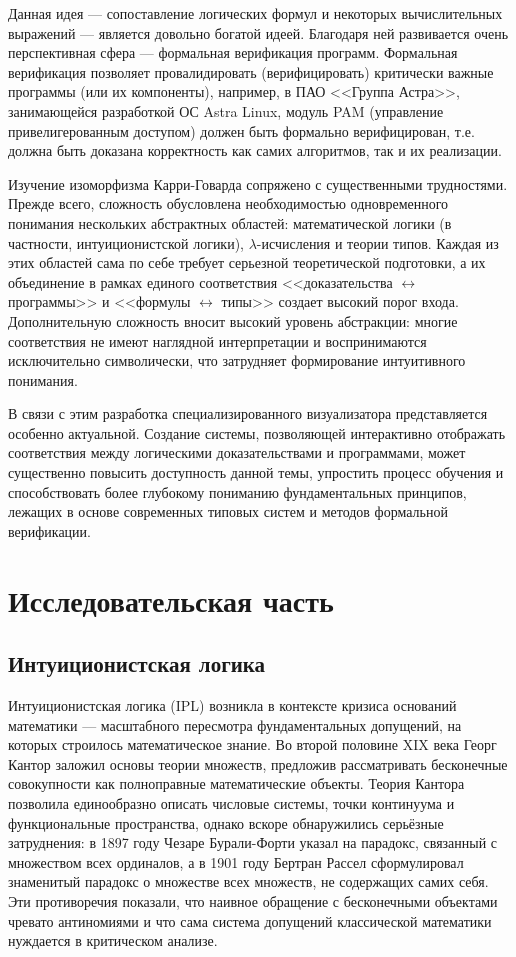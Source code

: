 \documentclass[14pt, russian]{scrartcl}
\begin{document}
Данная идея --- сопоставление логических формул и некоторых вычислительных
выражений --- является довольно богатой идеей.  Благодаря ней развивается очень
перспективная сфера --- формальная верификация программ. Формальная верификация
позволяет провалидировать (верифицировать) критически важные программы (или их
компоненты), например, в ПАО <<Группа Астра>>, занимающейся разработкой ОС Astra
Linux, модуль PAM (управление привелигерованным доступом) должен быть формально
верифицирован, т.е. должна быть доказана корректность как самих алгоритмов, так и
их реализации.

Изучение изоморфизма Карри-Говарда сопряжено с существенными трудностями. Прежде
всего, сложность обусловлена необходимостью одновременного понимания нескольких
абстрактных областей: математической логики (в частности, интуиционистской
логики), $\lambda$-исчисления и теории типов. Каждая из этих областей сама по
себе требует серьезной теоретической подготовки, а их объединение в рамках
единого соответствия <<доказательства $\leftrightarrow$ программы>> и <<формулы
$\leftrightarrow$ типы>> создает высокий порог входа. Дополнительную сложность
вносит высокий уровень абстракции: многие соответствия не имеют наглядной
интерпретации и воспринимаются исключительно символически, что затрудняет
формирование интуитивного понимания.

В связи с этим разработка специализированного визуализатора представляется
особенно актуальной. Создание системы, позволяющей интерактивно отображать
соответствия между логическими доказательствами и программами, может существенно
повысить доступность данной темы, упростить процесс обучения и способствовать
более глубокому пониманию фундаментальных принципов, лежащих в основе
современных типовых систем и методов формальной верификации.

\section{Исследовательская часть}

\subsection{Интуиционистская логика}

Интуиционистская логика (IPL) возникла в контексте кризиса оснований математики ---
масштабного пересмотра фундаментальных допущений, на которых строилось
математическое знание. Во второй половине XIX века Георг Кантор заложил основы
теории множеств, предложив рассматривать бесконечные совокупности как
полноправные математические объекты. Теория Кантора позволила единообразно
описать числовые системы, точки континуума и функциональные пространства, однако
вскоре обнаружились серьёзные затруднения: в 1897 году Чезаре Бурали-Форти
указал на парадокс, связанный с множеством всех ординалов, а в 1901 году
Бертран Рассел сформулировал знаменитый парадокс о множестве всех множеств, не
содержащих самих себя. Эти противоречия показали, что наивное обращение с
бесконечными объектами чревато антиномиями и что сама система допущений
классической математики нуждается в критическом анализе.
\end{document}

